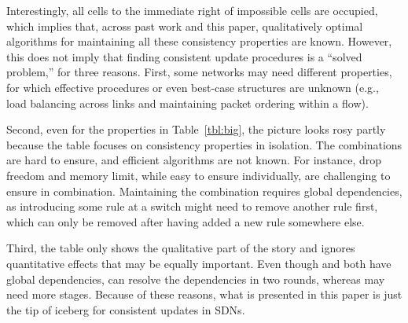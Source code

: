 Interestingly, all cells to the immediate right of impossible cells are occupied, which implies that, across past work and this paper,  qualitatively optimal algorithms for maintaining all these consistency properties are known. However, this does not imply that finding consistent update procedures is a ``solved problem,'' for three reasons. First, some networks may need different properties, for which effective procedures or even best-case structures are unknown (e.g., load balancing across links and maintaining packet ordering within a flow).

Second, even for the properties in Table~\ref{tbl:big}, the picture looks rosy partly because the table focuses on consistency properties in isolation. The combinations are hard to  ensure, and efficient algorithms are not known. For instance, drop freedom and memory limit, while easy to ensure individually, are challenging to ensure in combination. Maintaining the combination requires global dependencies, as introducing some rule at a switch might need to remove another rule first, which can only be removed after having added a new rule somewhere else.

Third, the table only shows the qualitative part of the story and ignores quantitative effects that may be equally important. Even though \cite{safeupdate} and \cite{swan} both have global dependencies, \cite{safeupdate} can resolve the dependencies in two rounds, whereas \cite{swan} may need more stages. Because of these reasons, what is presented in this paper is just the tip of iceberg for consistent updates in SDNs.
